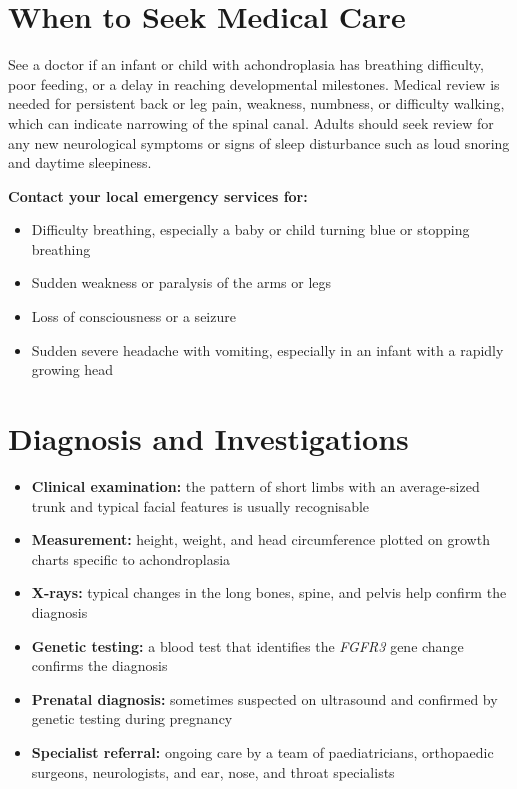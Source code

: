 \section*{When to Seek Medical Care}
See a doctor if an infant or child with achondroplasia has breathing difficulty, poor feeding, or a delay in reaching developmental milestones. Medical review is needed for persistent back or leg pain, weakness, numbness, or difficulty walking, which can indicate narrowing of the spinal canal. Adults should seek review for any new neurological symptoms or signs of sleep disturbance such as loud snoring and daytime sleepiness.

\textbf{Contact your local emergency services for:}
\begin{itemize}
    \item Difficulty breathing, especially a baby or child turning blue or stopping breathing
    \item Sudden weakness or paralysis of the arms or legs
    \item Loss of consciousness or a seizure
    \item Sudden severe headache with vomiting, especially in an infant with a rapidly growing head
\end{itemize}

\section*{Diagnosis and Investigations}
\begin{itemize}
    \item \textbf{Clinical examination:} the pattern of short limbs with an average-sized trunk and typical facial features is usually recognisable
    \item \textbf{Measurement:} height, weight, and head circumference plotted on growth charts specific to achondroplasia
    \item \textbf{X-rays:} typical changes in the long bones, spine, and pelvis help confirm the diagnosis
    \item \textbf{Genetic testing:} a blood test that identifies the \textit{FGFR3} gene change confirms the diagnosis
    \item \textbf{Prenatal diagnosis:} sometimes suspected on ultrasound and confirmed by genetic testing during pregnancy
    \item \textbf{Specialist referral:} ongoing care by a team of paediatricians, orthopaedic surgeons, neurologists, and ear, nose, and throat specialists
\end{itemize}

